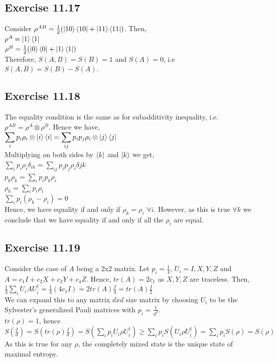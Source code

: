 \documentclass[a4paper,12pt]{article}
\begin{document}
\subsection*{Exercise 11.17}
Consider $\rho^{AB}=\frac{1}{2}(\ket{10}\bra{10}+\ket{11}\bra{11})$. Then,\\
$\rho^A=\ket{1}\bra{1}$\\
$\rho^B=\frac{1}{2}(\ket{0}\bra{0}+\ket{1}\bra{1})$\\
Therefore, $S(A,B)=S(B)=1$ and $S(A)=0$, i.e $S(A,B)=S(B)-S(A)$.
\subsection*{Exercise 11.18}
The equality condition is the same as for subadditivity inequality, i.e. $\rho^{AB}=\rho^A\otimes \rho^B$.
Hence we have,\\
$\displaystyle\sum_ip_i\rho_i\otimes\ket{i}\bra{i}=\sum_{ij}p_ip_j\rho_i\otimes\ket{j}\bra{j}$\\
Multiplying on both sides by $\bra{k}$ and $\ket{k}$ we get,\\
$\displaystyle\sum_ip_i\rho_i\delta_{ik}=\sum_{ij}p_ip_j\rho_i\delta{jk}$\\
$\displaystyle p_k\rho_k=\sum_{i}p_ip_k\rho_i$\\
$\displaystyle\rho_k=\sum_{i}p_i\rho_i$\\
$\displaystyle\sum_ip_i(\rho_k-\rho_i)=0$\\
Hence, we have equality if and only if $\rho_k=\rho_i$ $\forall i$. However, 
as this is true $\forall k$ we conclude that we have equality if and only if all
the $\rho_i$ are equal.
\subsection*{Exercise 11.19}
Consider the case of $A$ being a 2x2 matrix. Let $p_i=\frac{1}{4}$, $U_i={I,X,Y,Z}$ and
$A=c_1I+c_2X+c_2Y+c_4Z$. Hence, $tr(A)=2c_1$ as $X,Y,Z$ are traceless. Then,\\
$\displaystyle\frac{1}{4}\sum_iU_iAU_i^\dagger=\frac{1}{4}(4c_1I)=2tr(A)\frac{I}{4}=
tr(A)\frac{I}{2}$\\
We can expand this to any matrix $dxd$ size matrix by choosing $U_i$ to be the 
Sylvester's generalized Pauli matrices with $p_i=\frac{1}{d^2}$.\\
$tr(\rho)=1$, hence\\
$S(\frac{I}{d})=S(tr(\rho)\frac{I}{d})=S(\displaystyle\sum_ip_iU_i\rho U_i^\dagger)\geq
\sum_ip_iS(U_i\rho U_i^\dagger)=\sum_ip_iS(\rho)=S(\rho)$\\
As this is true for any $\rho$, the completely mixed state is the unique state of maximal entropy.
\end{document}
